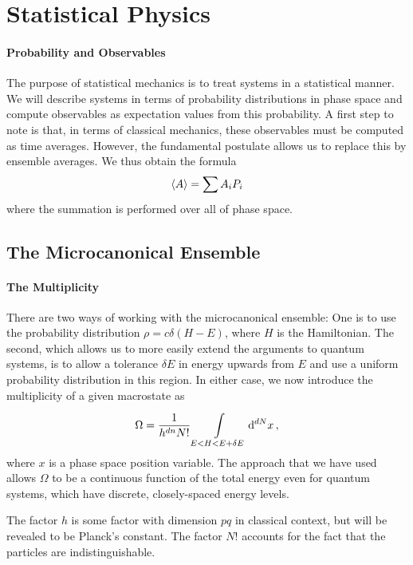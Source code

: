 \section{Statistical Physics}

\paragraph{Probability and Observables}
The purpose of statistical mechanics is to treat systems in a statistical manner. We will describe systems in terms of probability distributions in phase space and compute observables as expectation values from this probability. A first step to note is that, in terms of classical mechanics, these observables must be computed as time averages. However, the fundamental postulate allows us to replace this by ensemble averages. We thus obtain the formula
\begin{align*}
	\expval{A} = \sum A_{i}P_{i}
\end{align*}
where the summation is performed over all of phase space.

\subsection{The Microcanonical Ensemble}

\paragraph{The Multiplicity}
There are two ways of working with the microcanonical ensemble: One is to use the probability distribution $\rho = c\delta(H - E)$, where $H$ is the Hamiltonian. The second, which allows us to more easily extend the arguments to quantum systems, is to allow a tolerance $\delta E$ in energy upwards from $E$ and use a uniform probability distribution in this region. In either case, we now introduce the multiplicity of a given macrostate as
\begin{align*}
	\Omega = \frac{1}{h^{dn}N!}\integ[dN]{E < H < E + \delta E}{}{x}{},
\end{align*}
where $x$ is a phase space position variable. The approach that we have used allows $\Omega$ to be a continuous function of the total energy even for quantum systems, which have discrete, closely-spaced energy levels.

The factor $h$ is some factor with dimension $pq$ in classical context, but will be revealed to be Planck's constant. The factor $N!$ accounts for the fact that the particles are indistinguishable.

